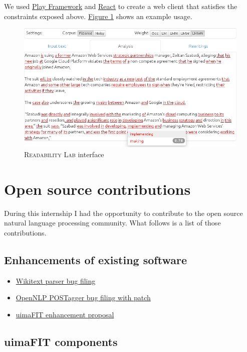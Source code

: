 \documentclass[a4paper, 11pt, onepage]{scrreprt}
\newcommand\figureref[1]{\hyperref[#1]{Figure \ref*{#1}}}
\begin{document}
We used \href{http://www.playframework.com/}{Play Framework} and
\href{https://facebook.github.io/react/}{React} to create a web client
that satisfies the constraints exposed above. \figureref{fig:ui} shows
an example usage.

\begin{figure}[H]
  \centering
  \includegraphics[width=\textwidth]{ui}
  \caption{\textsc{Readability Lab} interface}
  \label{fig:ui}
\end{figure}

\chapter{Open source contributions}
\label{cha:oss-contribs}

During this internship I had the opportunity to contribute to the open
source natural language processing community. What follows is a list
of those contributions.

\section{Enhancements of existing software}
\label{sec:enhancements}

\begin{itemize}
\item
  \href{https://bugs.eclipse.org/bugs/show_bug.cgi?id=433163}{Wikitext
    parser bug filing}
\item \href{https://issues.apache.org/jira/browse/OPENNLP-676}{OpenNLP
    POSTagger bug filing with patch}
\item \href{https://issues.apache.org/jira/browse/UIMA-3913}{uimaFIT
    enhancement proposal}
\end{itemize}

\section{uimaFIT components}
\label{sec:uimafit-components}
\end{document}
